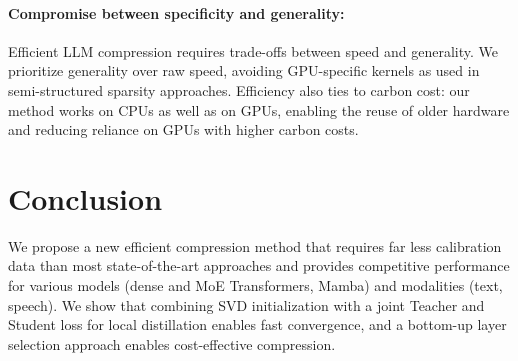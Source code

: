 \paragraph{Compromise between specificity and generality:}
Efficient LLM compression requires trade-offs between speed and generality. We prioritize generality over raw speed, avoiding GPU-specific kernels as used in semi-structured sparsity approaches. Efficiency also ties to carbon cost: our method works on CPUs as well as on
GPUs, enabling the reuse of older hardware and reducing reliance on GPUs with higher carbon costs.

\section{Conclusion}
We propose a new efficient compression method that
requires far less calibration data than most state-of-the-art approaches
and provides competitive performance for various models (dense and MoE Transformers, Mamba) and modalities (text, speech).
We show that combining SVD initialization with a joint Teacher and Student loss for local distillation enables fast convergence, and a bottom-up layer selection approach enables cost-effective compression.
